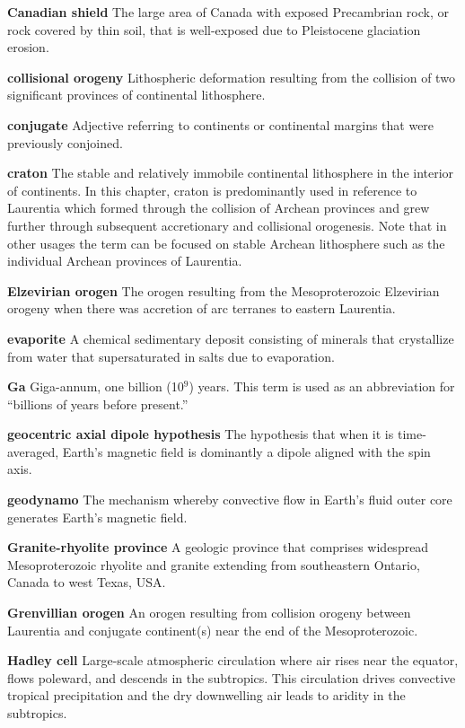 \documentclass[twocolumn, switch]{article} %
\begin{document}
\noindent\textbf{Canadian shield } The large area of Canada with exposed Precambrian rock, or rock covered by thin soil, that is well-exposed due to Pleistocene glaciation erosion.

\noindent\textbf{collisional orogeny } Lithospheric deformation resulting from the collision of two significant provinces of continental lithosphere.

\noindent\textbf{conjugate } Adjective referring to continents or continental margins that were previously conjoined.

\noindent\textbf{craton } The stable and relatively immobile continental lithosphere in the interior of continents. In this chapter, craton is predominantly used in reference to Laurentia which formed through the collision of Archean provinces and grew further through subsequent accretionary and collisional orogenesis. Note that in other usages the term can be focused on stable Archean lithosphere such as the individual Archean provinces of Laurentia.

\noindent\textbf{Elzevirian orogen } The orogen resulting from the Mesoproterozoic Elzevirian orogeny when there was accretion of arc terranes to eastern Laurentia.

\noindent\textbf{evaporite } A chemical sedimentary deposit consisting of minerals that crystallize from water that supersaturated in salts due to evaporation.

\noindent\textbf{Ga } Giga-annum, one billion (10$^9$) years. This term is used as an abbreviation for ``billions of years before present.''

\noindent\textbf{geocentric axial dipole hypothesis } The hypothesis that when it is time-averaged, Earth's magnetic field is dominantly a dipole aligned with the spin axis. 

\noindent\textbf{geodynamo } The mechanism whereby convective flow in Earth's fluid outer core generates Earth's magnetic field.

\noindent\textbf{Granite-rhyolite province } A geologic province that comprises widespread Mesoproterozoic rhyolite and granite extending from southeastern Ontario, Canada to west Texas, USA.

\noindent\textbf{Grenvillian orogen } An orogen resulting from collision orogeny between Laurentia and conjugate continent(s) near the end of the Mesoproterozoic.

\noindent\textbf{Hadley cell } Large-scale atmospheric circulation where air rises near the equator, flows poleward, and descends in the subtropics. This circulation drives convective tropical precipitation and the dry downwelling air leads to aridity in the subtropics.
\end{document}
